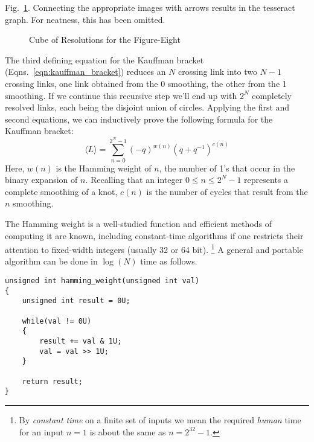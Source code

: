         Fig.~\ref{fig:figure_eight_knot_cube_of_resolutions}.
        Connecting the appropriate images with arrows results in the tesseract
        graph. For neatness, this has been omitted.
        \begin{figure}
            \centering
            \caption{Cube of Resolutions for the Figure-Eight}
            \label{fig:figure_eight_knot_cube_of_resolutions}
        \end{figure}
        \par\hfill\par
        The third defining equation for the Kauffman bracket
        (Eqns.~\ref{eqn:kauffman_bracket})
        reduces an $N$ crossing link into two $N-1$ crossing
        links, one link obtained from the 0 smoothing, the other from the
        1 smoothing. If we continue this recursive step we'll end up with
        $2^{N}$ completely resolved links, each being the disjoint union of
        circles. Applying the first and second equations, we can inductively
        prove the following formula for the Kauffman bracket:
        \begin{equation}
            \label{eqn:kauffman_bracket}%
            \langle{L}\rangle=\sum_{n=0}^{2^{N}-1}
                (-q)^{w(n)}(q+q^{-1})^{c(n)}
        \end{equation}
        Here, $w(n)$ is the Hamming weight of $n$, the number of 1's
        that occur in the binary expansion of $n$. Recalling that an integer
        $0\leq{n}\leq{2}^{N}-1$ represents a complete smoothing of a knot,
        $c(n)$ is the number of cycles that result from the $n$ smoothing.
        \par\hfill\par
        The Hamming weight is a well-studied function and efficient methods of
        computing it are known, including constant-time algorithms if one
        restricts their attention to fixed-width integers
        (usually 32 or 64 bit).%
        \footnote{
            By \textit{constant time} on a finite set of inputs we mean the
            required \textit{human} time for an input $n=1$ is about the same
            as $n=2^{32}-1$.
        }
        A general and portable algorithm can be done in
        $\log(N)$ time as follows.
\begin{lstlisting}[style=CStyle]
unsigned int hamming_weight(unsigned int val)
{
    unsigned int result = 0U;

    while(val != 0U)
    {
        result += val & 1U;
        val = val >> 1U;
    }

    return result;
}
\end{lstlisting}
